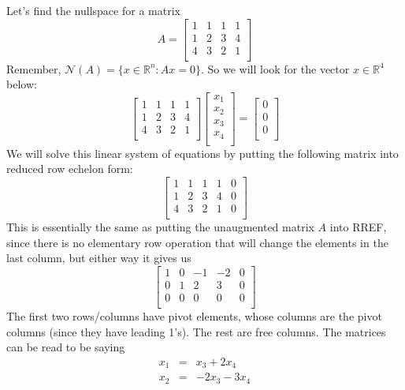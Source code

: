 \documentclass[10pt,letterpaper]{article}
\begin{document}
Let's find the nullspace for a matrix
\[
A=
\begin{bmatrix}
  1 & 1 & 1 & 1 \\
  1 & 2 & 3 & 4 \\
  4 & 3 & 2 & 1 \\
\end{bmatrix}
\]
Remember, $\mathcal{N}(A) = \{x \in \mathbb{R}^{n}: Ax = 0\}$. So we will look for the vector $x \in \mathbb{R}^{4}$ below:
\[
\begin{bmatrix}
  1 & 1 & 1 & 1 \\
  1 & 2 & 3 & 4 \\
  4 & 3 & 2 & 1 \\
\end{bmatrix}
\begin{bmatrix}
  x_1 \\
  x_2 \\
  x_3 \\
  x_4 \\
\end{bmatrix}
=
\begin{bmatrix}
  0 \\
  0 \\
  0 \\
\end{bmatrix}
\]
We will solve this linear system of equations by putting the following matrix into reduced row echelon form:
\[
\begin{bmatrix}
  1 & 1 & 1 & 1 & 0\\
  1 & 2 & 3 & 4 & 0\\
  4 & 3 & 2 & 1 & 0\\
\end{bmatrix}
\]
This is essentially the same as putting the unaugmented matrix $A$ into RREF, since there is no elementary row operation that will change the elements in the last column, but either way it gives us
\[
\begin{bmatrix}
  1 & 0 & -1 & -2 & 0 \\
  0 & 1 &  2 &  3 & 0 \\
  0 & 0 &  0 &  0 & 0 \\
\end{bmatrix}
\]
The first two rows/columns have pivot elements, whose columns are the pivot columns (since they have leading 1's). The rest are free columns. The matrices can be read to be saying
\begin{eqnarray}
x_1 &=& x_3 + 2 x_4 \\
x_2 &=& -2 x_3 - 3 x_4
\end{eqnarray}
\end{document}
